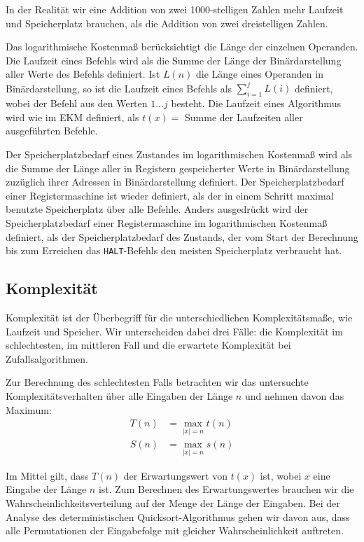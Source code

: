 In der Realität wir eine Addition von zwei 1000-stelligen Zahlen mehr Laufzeit und Speicherplatz brauchen, als die Addition von zwei dreistelligen Zahlen.

\begin{Def}\label{defLKM}
\hspace{\parindent}Das logarithmische Kostenmaß berücksichtigt die Länge der einzelnen Operanden. Die Laufzeit eines Befehls wird als die Summe der Länge der Binärdarstellung aller Werte des Befehls definiert. Ist $L(n)$ die Länge eines Operanden in Binärdarstellung, so ist die Laufzeit eines Befehls als $\sum_{i=1}^{j}L(i)$ definiert, wobei der Befehl aus den Werten $1 \ldots j$ besteht. Die Laufzeit eines Algorithmus wird wie im EKM definiert, als $t(x)=$ Summe der Laufzeiten aller ausgeführten Befehle.

Der Speicherplatzbedarf eines Zustandes im logarithmischen Kostenmaß wird als die Summe der Länge aller in Registern gespeicherter Werte in Binärdarstellung zuzüglich ihrer Adressen in Binärdarstellung definiert. Der Speicherplatzbedarf einer Registermaschine ist wieder definiert, als der in einem Schritt maximal benutzte Speicherplatz über alle Befehle. Anders ausgedrückt wird der Speicherplatzbedarf einer Registermaschine im logarithmischen Kostenmaß definiert, als der Speicherplatzbedarf des Zustands, der vom Start der Berechnung bis zum Erreichen das \texttt{HALT}-Befehls den meisten Speicherplatz verbraucht hat.
\end{Def}

\subsection{Komplexität}
Komplexität ist der Überbegriff für die unterschiedlichen Komplexitätsmaße, wie Laufzeit und Speicher. Wir unterscheiden dabei drei Fälle: die Komplexität im schlechtesten, im mittleren Fall und die erwartete Komplexität bei Zufallsalgorithmen.

Zur Berechnung des schlechtesten Falls betrachten wir das untersuchte Komplexitätsverhalten über alle Eingaben der Länge $n$ und nehmen davon das Maximum:
\begin{align*}
  T(n) &= \max_{|x|=n} t(n) \\
  S(n) &= \max_{|x|=n} s(n)
\end{align*}

Im Mittel gilt, dass $T(n)$ der Erwartungswert von $t(x)$ ist, wobei $x$ eine Eingabe der Länge $n$ ist. Zum Berechnen des Erwartungswertes brauchen wir die Wahrscheinlichkeitsverteilung auf der Menge der Länge der Eingaben. Bei der Analyse des deterministischen Quicksort-Algorithmus gehen wir davon aus, dass alle Permutationen der Eingabefolge mit gleicher Wahrscheinlichkeit auftreten.


